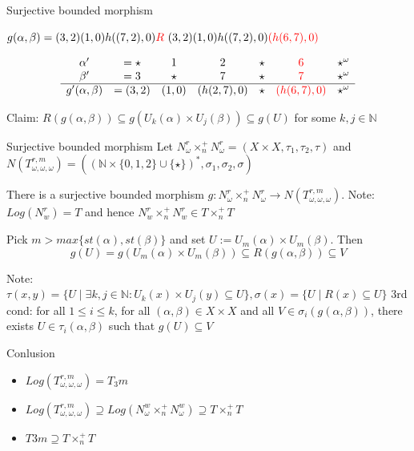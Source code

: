 \begin{frame}{Surjective bounded morphism}


$g(\alpha,\beta) = (3,2)(1,0) h((7,2),0) \textcolor{red}{R} \mbox{     }(3,2)(1,0) h((7,2),0) \textcolor{red}{(h(6,7),0)}$

\[
\begin{array}{ccccccc}
\alpha' &= \star & 1 & 2 & \star & \textcolor{red}{6} & \star^\omega\\
\beta'  &= 3     & \star & 7 & \star & \textcolor{red}{7} & \star^\omega\\
\hline 
g'(\alpha,\beta) &= (3,2) & (1,0) & (h(2,7),0) & \star & \textcolor{red}{(h(6,7),0)}& \star^\omega
\end{array}
\]
\vspace{0.5cm}

{ 
	Claim: $R(g(\alpha,\beta)) \subseteq g(U_k(\alpha) \times U_j(\beta)) \subseteq g(U)$ for some $k,j \in \mathbb{N}$	}



	
\end{frame}

\begin{frame}{Surjective bounded morphism}
			Let $N_\omega^r \times_n^+ N_\omega^r = (X \times X, \tau_1, \tau_2, \tau)$ and $N(T_{\omega,\omega,\omega}^{r,m}) = ((\mathbb{N} \times \{0,1,2\} \cup \{\star\})^*, \sigma_1, \sigma_2, \sigma)$
		\begin{theorem}
		There is a surjective bounded morphism $g: N_\omega^r \times_n^+ N_\omega^r \to N(T_{\omega,\omega,\omega}^{r,m})$. Note: $Log(N_w^r) = T$ and hence $N_w^r \times_n^+ N_w^r \in T \times_n^+ T$
		\end{theorem}
		Pick $m > max\{st(\alpha),st(\beta)\}$ and set $U:= U_m(\alpha) \times U_m(\beta)$. Then 
		\[
			g(U) = g(U_m(\alpha) \times U_m(\beta)) \subseteq R(g(\alpha,\beta)) \subseteq V
		\]

		{
		Note: $\tau(x,y) = \{U \mid \exists k,j \in \mathbb{N}: U_k(x) \times U_j(y) \subseteq U\}, \sigma(x) = \{U \mid R(x) \subseteq U\}$\newline
		3rd cond: for all $1 \le i \le k$, for all $(\alpha,\beta) \in X \times X$ and all $V \in \sigma_i(g(\alpha,\beta))$, there exists $U \in \tau_i(\alpha,\beta)$ such that $g(U) \subseteq V$ 
		}
\end{frame}

\begin{frame}[t]{Conlusion}
	
	
\begin{itemize}
	\setlength{\itemsep}{1em}

	\item $Log(T_{\omega,\omega,\omega}^{r,m}) = T_3m$ \pause
	\item $Log(T_{\omega,\omega,\omega}^{r,m}) \supseteq Log(N_\omega^w \times_n^+ N_\omega^w )\supseteq T \times_n^+ T $ \pause
	\item $T3m \supseteq T \times_n^+ T$
	
\end{itemize}



\end{frame}

